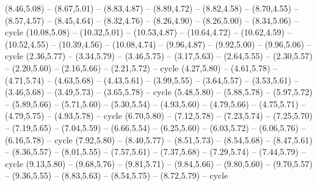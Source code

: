 \expandafter\def\csname geo:Tissot:k23\endcsname{
  (8.46,5.08) -- (8.67,5.01) -- (8.83,4.87) -- (8.89,4.72) -- (8.82,4.58) -- (8.70,4.55) -- (8.57,4.57) -- (8.45,4.64) -- (8.32,4.76) -- (8.26,4.90) -- (8.26,5.00) -- (8.34,5.06) -- cycle}
\expandafter\def\csname geo:Tissot:k24\endcsname{
  (10.08,5.08) -- (10.32,5.01) -- (10.53,4.87) -- (10.64,4.72) -- (10.62,4.59) -- (10.52,4.55) -- (10.39,4.56) -- (10.08,4.74) -- (9.96,4.87) -- (9.92,5.00) -- (9.96,5.06) -- cycle}
\expandafter\def\csname geo:Tissot:k25\endcsname{
  (2.36,5.77) -- (3.34,5.79) -- (3.46,5.75) -- (3.17,5.63) -- (2.64,5.55) -- (2.30,5.57) -- (2.20,5.60) -- (2.16,5.66) -- (2.21,5.72) -- cycle}
\expandafter\def\csname geo:Tissot:k26\endcsname{
  (4.27,5.80) -- (4.61,5.78) -- (4.71,5.74) -- (4.63,5.68) -- (4.43,5.61) -- (3.99,5.55) -- (3.64,5.57) -- (3.53,5.61) -- (3.46,5.68) -- (3.49,5.73) -- (3.65,5.78) -- cycle}
\expandafter\def\csname geo:Tissot:k27\endcsname{
  (5.48,5.80) -- (5.88,5.78) -- (5.97,5.72) -- (5.89,5.66) -- (5.71,5.60) -- (5.30,5.54) -- (4.93,5.60) -- (4.79,5.66) -- (4.75,5.71) -- (4.79,5.75) -- (4.93,5.78) -- cycle}
\expandafter\def\csname geo:Tissot:k28\endcsname{
  (6.70,5.80) -- (7.12,5.78) -- (7.23,5.74) -- (7.25,5.70) -- (7.19,5.65) -- (7.04,5.59) -- (6.66,5.54) -- (6.25,5.60) -- (6.03,5.72) -- (6.06,5.76) -- (6.16,5.78) -- cycle}
\expandafter\def\csname geo:Tissot:k29\endcsname{
  (7.92,5.80) -- (8.40,5.77) -- (8.51,5.73) -- (8.54,5.68) -- (8.47,5.61) -- (8.36,5.57) -- (8.01,5.55) -- (7.57,5.61) -- (7.37,5.68) -- (7.29,5.74) -- (7.44,5.79) -- cycle}
\expandafter\def\csname geo:Tissot:k30\endcsname{
  (9.13,5.80) -- (9.68,5.76) -- (9.81,5.71) -- (9.84,5.66) -- (9.80,5.60) -- (9.70,5.57) -- (9.36,5.55) -- (8.83,5.63) -- (8.54,5.75) -- (8.72,5.79) -- cycle}


